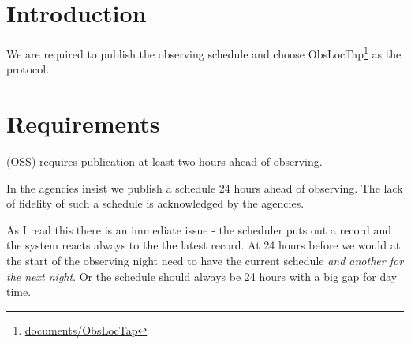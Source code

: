 \section{Introduction}
We are required to publish the observing schedule and choose ObsLocTap\footnote{\url{documents/ObsLocTap}} as the protocol.

\section{Requirements}

 (OSS) requires publication at least two hours ahead of observing.

In  the agencies insist we publish a schedule 24 hours ahead of observing.
The lack of fidelity of such a schedule is acknowledged by the agencies.

As I read this there is an immediate issue - the scheduler puts out a record and the system reacts always to the the latest record.
At 24 hours before we would at the start of the observing night need to have the current schedule \emph{and another for the next night}.
Or the schedule should always be 24 hours with a big gap for day time.

